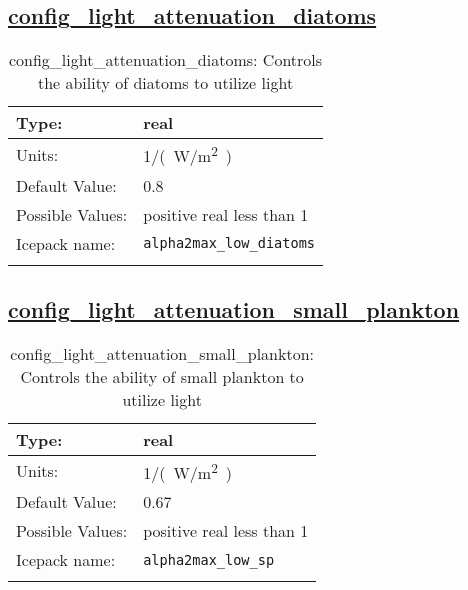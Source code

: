 \subsection[config\_light\_attenuation\_diatoms]{\hyperref[sec:nm_tab_biogeochemistry]{config\_light\_attenuation\_diatoms}}
\label{subsec:nm_sec_config_light_attenuation_diatoms}
\begin{center}
\begin{longtable}{| p{2.0in} || p{4.0in} |}
    \hline
    Type: & real \\
    \hline
    Units: & \si{1/(W/m^2)} \\
    \hline
    Default Value: & 0.8 \\
    \hline
    Possible Values: & positive real less than 1 \\
    \hline
    Icepack name: & \verb+alpha2max_low_diatoms+ \\
    \hline
    \caption{config\_light\_attenuation\_diatoms: Controls the ability of diatoms to utilize light}
\end{longtable}
\end{center}
\subsection[config\_light\_attenuation\_small\_plankton]{\hyperref[sec:nm_tab_biogeochemistry]{config\_light\_attenuation\_small\_plankton}}
\label{subsec:nm_sec_config_light_attenuation_small_plankton}
\begin{center}
\begin{longtable}{| p{2.0in} || p{4.0in} |}
    \hline
    Type: & real \\
    \hline
    Units: & \si{1/(W/m^2)} \\
    \hline
    Default Value: & 0.67 \\
    \hline
    Possible Values: & positive real less than 1 \\
    \hline
    Icepack name: & \verb+alpha2max_low_sp+ \\
    \hline
    \caption{config\_light\_attenuation\_small\_plankton: Controls the ability of small plankton to utilize light}
\end{longtable}
\end{center}
